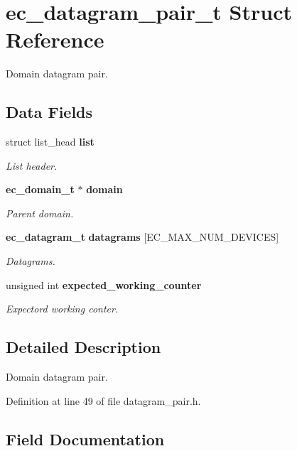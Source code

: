 \section{ec\-\_\-datagram\-\_\-pair\-\_\-t \-Struct \-Reference}
\label{structec__datagram__pair__t}


\-Domain datagram pair.  


\subsection*{\-Data \-Fields}
\begin{DoxyCompactItemize}
\item 
struct list\-\_\-head {\bf list}
\begin{DoxyCompactList}\small\item\em \-List header. \end{DoxyCompactList}\item 
{\bf ec\-\_\-domain\-\_\-t} $\ast$ {\bf domain}
\begin{DoxyCompactList}\small\item\em \-Parent domain. \end{DoxyCompactList}\item 
{\bf ec\-\_\-datagram\-\_\-t} {\bf datagrams} [\-E\-C\-\_\-\-M\-A\-X\-\_\-\-N\-U\-M\-\_\-\-D\-E\-V\-I\-C\-E\-S]
\begin{DoxyCompactList}\small\item\em \-Datagrams. \end{DoxyCompactList}\item 
unsigned int {\bf expected\-\_\-working\-\_\-counter}
\begin{DoxyCompactList}\small\item\em \-Expectord working conter. \end{DoxyCompactList}\end{DoxyCompactItemize}


\subsection{\-Detailed \-Description}
\-Domain datagram pair. 

\-Definition at line 49 of file datagram\-\_\-pair.\-h.



\subsection{\-Field \-Documentation}
